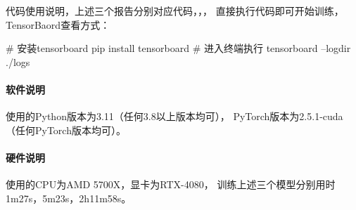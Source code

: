 \documentclass[12pt, a4paper, oneside]{ctexart}
\numberwithin{equation}{section}  %
\def\add{\vspace{1ex}}      %
\begin{document}
代码使用说明，上述三个报告分别对应代码，，，
直接执行代码即可开始训练，TensorBaord查看方式：\add
\begin{pythoncode}
# 安装tensorboard
pip install tensorboard
# 进入终端执行
tensorboard --logdir ./logs
\end{pythoncode}

\paragraph{软件说明}
使用的Python版本为3.11（任何3.8以上版本均可），
PyTorch版本为2.5.1-cuda（任何PyTorch版本均可）。

\paragraph{硬件说明}使用的CPU为AMD 5700X，显卡为RTX-4080，
训练上述三个模型分别用时1m27s，5m23s，2h11m58s。
\end{document}
